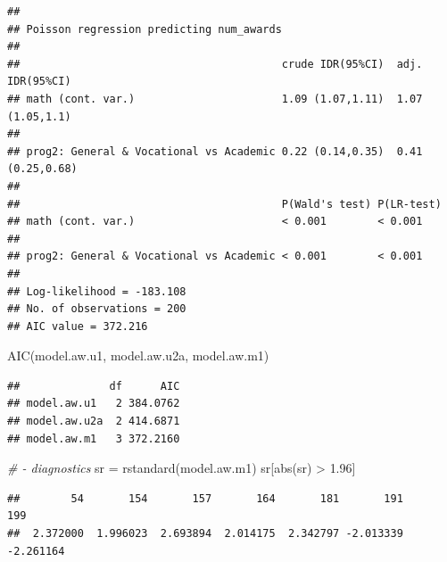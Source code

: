 \documentclass[
]{book}
\makeatletter
\newenvironment{Shaded}{\begin{snugshade}}{\end{snugshade}}
\newcommand{\AttributeTok}[1]{\textcolor[rgb]{0.61,0.61,0.61}{#1}}
\newcommand{\CommentTok}[1]{\textcolor[rgb]{0.37,0.37,0.37}{\textit{#1}}}
\newcommand{\DecValTok}[1]{\textcolor[rgb]{0.06,0.06,0.06}{#1}}
\newcommand{\FloatTok}[1]{\textcolor[rgb]{0.06,0.06,0.06}{#1}}
\newcommand{\FunctionTok}[1]{\textcolor[rgb]{0,0,0}{#1}}
\newcommand{\NormalTok}[1]{#1}
\newcommand{\OtherTok}[1]{\textcolor[rgb]{0.37,0.37,0.37}{#1}}
\newcommand{\SpecialCharTok}[1]{\textcolor[rgb]{0,0,0}{#1}}
\newenvironment{kframe}{%
\medskip{}
\setlength{\fboxsep}{.8em}
 \def\at@end@of@kframe{}%
 \ifinner\ifhmode%
  \def\at@end@of@kframe{\end{minipage}}%
  \begin{minipage}{\columnwidth}%
 \fi\fi%
 \def\FrameCommand##1{\hskip\@totalleftmargin \hskip-\fboxsep
 \colorbox{shadecolor}{##1}\hskip-\fboxsep
     \hskip-\linewidth \hskip-\@totalleftmargin \hskip\columnwidth}%
 \MakeFramed {\advance\hsize-\width
   \@totalleftmargin\z@ \linewidth\hsize
   \@setminipage}}%
 {\par\unskip\endMakeFramed%
 \at@end@of@kframe}
\renewenvironment{Shaded}{\begin{kframe}}{\end{kframe}}
\makeatother
\begin{document}
\begin{verbatim}
## 
## Poisson regression predicting num_awards 
##  
##                                         crude IDR(95%CI)  adj. IDR(95%CI)  
## math (cont. var.)                       1.09 (1.07,1.11)  1.07 (1.05,1.1)  
##                                                                            
## prog2: General & Vocational vs Academic 0.22 (0.14,0.35)  0.41 (0.25,0.68) 
##                                                                            
##                                         P(Wald's test) P(LR-test)
## math (cont. var.)                       < 0.001        < 0.001   
##                                                                  
## prog2: General & Vocational vs Academic < 0.001        < 0.001   
##                                                                  
## Log-likelihood = -183.108
## No. of observations = 200
## AIC value = 372.216
\end{verbatim}

\begin{Shaded}
\begin{Highlighting}[]
\FunctionTok{AIC}\NormalTok{(model.aw.u1, model.aw.u2a, model.aw.m1)}
\end{Highlighting}
\end{Shaded}

\begin{verbatim}
##              df      AIC
## model.aw.u1   2 384.0762
## model.aw.u2a  2 414.6871
## model.aw.m1   3 372.2160
\end{verbatim}

\begin{Shaded}
\begin{Highlighting}[]
\CommentTok{\# {-} diagnostics}
\NormalTok{sr }\OtherTok{=} \FunctionTok{rstandard}\NormalTok{(model.aw.m1)}
\NormalTok{sr[}\FunctionTok{abs}\NormalTok{(sr) }\SpecialCharTok{\textgreater{}} \FloatTok{1.96}\NormalTok{]}
\end{Highlighting}
\end{Shaded}

\begin{verbatim}
##        54       154       157       164       181       191       199 
##  2.372000  1.996023  2.693894  2.014175  2.342797 -2.013339 -2.261164
\end{verbatim}

\begin{Shaded}
\end{Shaded}
\end{document}
